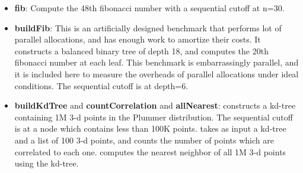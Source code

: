 \begin{itemize}

\item \textbf{fib}:
  Compute the 48th fibonacci number with a sequential cutoff at n=30.

\item \textbf{buildFib}:
  This is an artificially designed benchmark that performs lot of parallel
  allocations, and has enough work to amortize their costs.
  It constructs a balanced binary tree of depth 18, and computes
  the 20th fibonacci number at each leaf.
  This benchmark is embarrassingly parallel, and it is included here to
  measure the overheads of parallel allocations under ideal conditions.
  The sequential cutoff is at depth=6.


\item \textbf{buildKdTree} and \textbf{countCorrelation} and \textbf{allNearest}:
   constructs a kd-tree \cite{kdtree}
  containing 1M 3-d points
  in the Plummer distribution.
  The sequential cutoff is at a node which contains less than 100K points.
   takes as input a kd-tree and a list of 100 3-d points,
  and counts the number of points which are correlated to each one.
   computes the nearest neighbor of all 1M 3-d points using the kd-tree.




\end{itemize}
